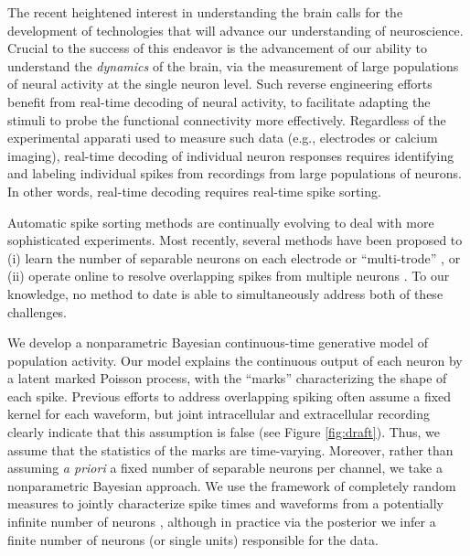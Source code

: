 
The recent heightened interest in understanding the brain calls for the development of technologies that will advance our understanding of neuroscience.%
Crucial to the success of this endeavor is the advancement of our ability to understand the \emph{dynamics} of the brain, via the measurement of large populations of neural activity at the single neuron level.  Such reverse engineering efforts  benefit from real-time decoding of neural activity, to facilitate adapting the stimuli to probe the functional connectivity more effectively.  Regardless of the experimental apparati used to measure such data (e.g., electrodes or calcium imaging), real-time decoding of individual neuron responses requires identifying and labeling individual spikes from recordings from large populations of neurons.
In other words, real-time decoding requires real-time spike sorting.

Automatic spike sorting methods are continually evolving to deal with more sophisticated experiments.  Most recently, several methods have been proposed to (i) learn the number of separable neurons on each electrode or ``multi-trode'' \cite{??}, or (ii) operate online to resolve overlapping spikes from multiple neurons \cite{??}.   To our knowledge, no method to date is able to simultaneously address both of these challenges.  

We develop a nonparametric Bayesian continuous-time generative model of population activity.  Our model explains the continuous output of each neuron
by a latent marked Poisson process, with the ``marks'' characterizing the shape of each spike.  Previous efforts to address overlapping spiking often assume a fixed kernel for each waveform, but joint intracellular and extracellular recording clearly indicate that this assumption is false (see Figure \ref{fig:draft}). Thus, we assume that the statistics of the marks are time-varying.  Moreover, rather than assuming \emph{a priori} a fixed number of separable neurons per channel, we take a nonparametric Bayesian approach.  We use the framework of completely random measures to jointly characterize spike times and waveforms from 
a potentially infinite number of neurons \cite{??}, although in practice via the posterior we infer a finite number of neurons (or single units) responsible for the data.  

